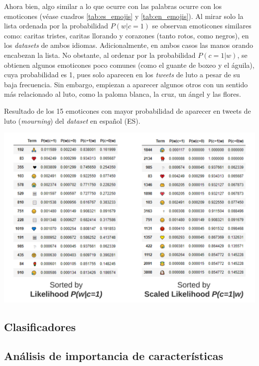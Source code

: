 Ahora bien, algo similar a lo que ocurre con las palabras ocurre con los emoticones (véase cuadros \ref{tab:es_emojis} y \ref{tab:en_emojis}). Al mirar solo la lista ordenada por la probabilidad $P(w|c=1)$ se observan emoticones similares como: caritas tristes, caritas llorando y corazones (tanto rotos, como negros), en los \textit{datasets} de ambos idiomas. Adicionalmente, en ambos casos las manos orando encabezan la lista. No obstante, al ordenar por la probabilidad $P(c=1|w)$, se obtienen algunos emoticones poco comunes (como el guante de boxeo y el águila), cuya probabilidad es 1, pues solo aparecen en los \textit{tweets} de luto a pesar de su baja frecuencia. Sin embargo, empiezan a aparecer algunos otros con un sentido más relacionado al luto, como la paloma blanca, la cruz, un ángel y las flores. 

\begin{table}[H]
    \centering
    \caption{Resultado de los 15 emoticones con mayor probabilidad de aparecer en tweets de luto (\textit{mourning}) del \textit{dataset} en español (ES).}
    \label{tab:en_emojis}
    \includegraphics[width=\textwidth]{doc/images/EN_Emojis.png}
\end{table}

\subsection{Clasificadores}


\subsection{Análisis de importancia de características}